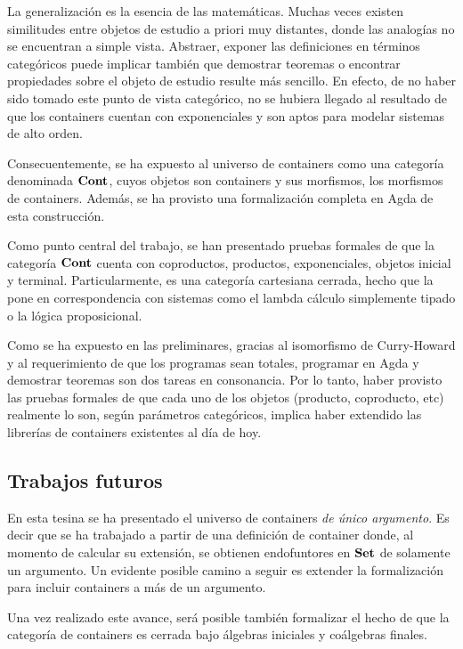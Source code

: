 La generalización es la esencia de las matemáticas. Muchas veces existen similitudes entre objetos de estudio a priori muy distantes, donde las analogías no se encuentran a simple vista. Abstraer, exponer las definiciones en términos categóricos puede implicar también que demostrar teoremas o encontrar propiedades sobre el objeto de estudio resulte más sencillo. En efecto, de no haber sido tomado este punto de vista categórico, no se hubiera llegado al resultado de que los containers cuentan con exponenciales y son aptos para modelar sistemas de alto orden. 

Consecuentemente, se ha expuesto al universo de containers como una categoría denominada $\mathbf{Cont}$, cuyos objetos son containers y sus morfismos, los morfismos de containers. Además, se ha provisto una formalización completa en Agda de esta construcción.

Como punto central del trabajo, se han presentado pruebas formales de que la categoría $\mathbf{Cont}$ cuenta con coproductos, productos, exponenciales, objetos inicial y terminal. 
Particularmente, es una categoría cartesiana cerrada, hecho que la pone en correspondencia con sistemas como el lambda cálculo simplemente tipado o la lógica proposicional.

Como se ha expuesto en las preliminares, gracias al isomorfismo de Curry-Howard y al requerimiento de que los programas sean totales, programar en Agda y demostrar teoremas son dos tareas en consonancia. Por lo tanto, haber provisto las pruebas formales de que cada uno de los objetos (producto, coproducto, etc) realmente lo son, según parámetros categóricos, implica haber extendido las librerías de containers existentes al día de hoy.


\subsection*{Trabajos futuros}

En esta tesina se ha presentado el universo de containers {\it de único argumento}. Es decir que se ha trabajado a partir de una definición de container donde, al momento de calcular su extensión, se obtienen endofuntores en $\mathbf{Set}$ de solamente un argumento. Un evidente posible camino a seguir es extender la formalización para incluir containers a más de un argumento.  

Una vez realizado este avance, será posible también formalizar el hecho de que la categoría de containers es cerrada bajo álgebras iniciales y coálgebras finales.

